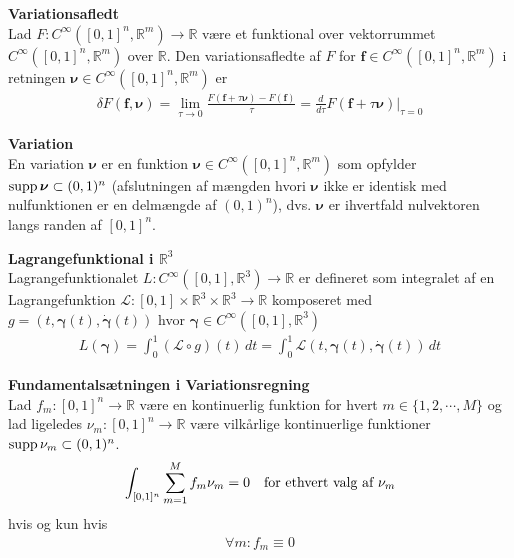 
\begin{dfn} {\bf Variationsafledt}\\
Lad $F : C^\infty ([0,1]^n, \mathbb{R}^m) \to \mathbb{R}$ være et funktional over vektorrummet $C^\infty([0,1]^n, \mathbb{R}^m)$ over $\mathbb{R}$. Den variationsafledte af $F$ for $\mathbf{f}\in C^\infty ([0,1]^n, \mathbb{R}^m)$ i retningen ${\boldsymbol \nu}\in C^\infty ([0,1]^n, \mathbb{R}^m)$ er
\begin{align*}
\delta F(\mathbf{f}, {\boldsymbol \nu}) = \lim_{\tau \to 0} \frac{F(\mathbf{f}+\tau{\boldsymbol \nu})-F(\mathbf{f})}{\tau} = \frac{d}{d\tau} F(\mathbf{f}+\tau {\boldsymbol \nu}) \Big|_{\tau = 0}
\end{align*}
\end{dfn}


\begin{dfn} {\bf Variation}\\
En variation ${\boldsymbol \nu}$ er en funktion ${\boldsymbol \nu} \in C^\infty ([0,1]^n, \mathbb{R}^m)$ som opfylder $\textnormal{supp}\, {\boldsymbol \nu} \subset (0,1)^n$ (afslutningen af mængden hvori ${\boldsymbol \nu}$ ikke er identisk med nulfunktionen er en delmængde af $ (0,1)^n$), dvs. ${\boldsymbol \nu}$ er ihvertfald nulvektoren langs randen af $[0,1]^n$.
\end{dfn}


\begin{dfn} {\bf Lagrangefunktional i $\mathbb{R}^3$}\\
Lagrangefunktionalet $L : C^\infty ([0,1], \mathbb{R}^3) \to \mathbb{R}$ er defineret som integralet af en Lagrangefunktion $\mathcal{L} : [0,1] \times \mathbb{R}^3 \times \mathbb{R}^3 \to \mathbb{R}$ komposeret med $g=(t,{\boldsymbol \gamma}(t),\dot{\boldsymbol \gamma}(t))$ hvor ${\boldsymbol \gamma} \in C^\infty ([0,1], \mathbb{R}^3)$
\begin{align*}
L({\boldsymbol \gamma})= \int_0^1 (\mathcal{L}\circ g)(t) \, dt =\int_0^1 \mathcal{L}(t, {\boldsymbol \gamma}(t),\dot{{\boldsymbol \gamma}}(t)) \, dt
\end{align*}
\end{dfn}


\begin{thm} {\bf Fundamentalsætningen i Variationsregning}\\
Lad $f_m : [0,1]^n \to \mathbb{R}$ være en kontinuerlig funktion for hvert $m \in \{1, 2, \cdots, M \}$ og lad ligeledes $\nu_m : [0,1]^n \to \mathbb{R}$ være vilkårlige kontinuerlige funktioner $\textnormal{supp}\, \nu_m \subset (0,1)^n$.
\begin{align*}
\int_{[0,1]^n} \sum_{m=1}^M f_m \nu_m = 0 \quad \textnormal{for ethvert valg af $\nu_m$}
\end{align*}
hvis og kun hvis 
\begin{align*}
\forall m : f_m \equiv 0
\end{align*}
\end{thm}


